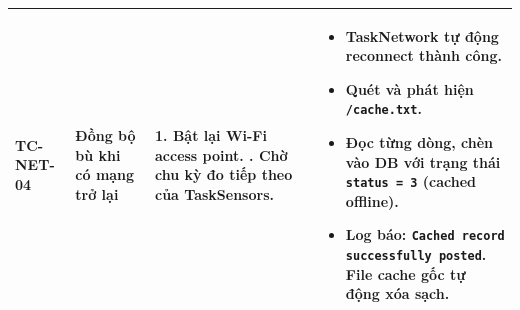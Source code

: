\begin{longtable}{llp{5.5cm}p{5.5cm}}
\textbf{TC-NET-04} & Đồng bộ bù khi có mạng trở lại &
1. Bật lại Wi-Fi access point. \newline
2. Chờ chu kỳ đo tiếp theo của TaskSensors. &
\begin{itemize}
    \item TaskNetwork tự động reconnect thành công.
    \item Quét và phát hiện \texttt{/cache.txt}.
    \item Đọc từng dòng, chèn vào DB với trạng thái \texttt{status = 3} (cached offline).
    \item Log báo: \texttt{Cached record successfully posted}. File cache gốc tự động xóa sạch.
\end{itemize} \\
\bottomrule
\end{longtable}
